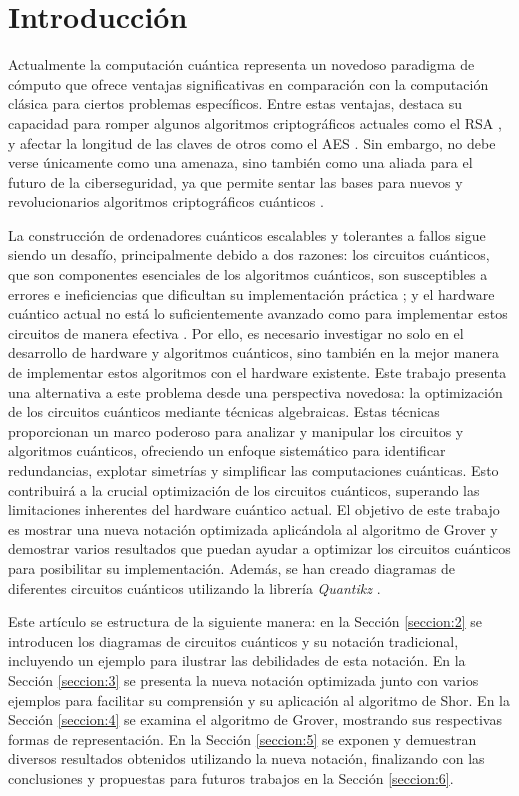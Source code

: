 \documentclass[10pt,conference,a4paper]{IEEEtran}
\begin{document}
\section{Introducción}
Actualmente la computación cuántica representa un novedoso paradigma de cómputo que ofrece ventajas significativas en comparación con la computación clásica para ciertos problemas específicos. Entre estas ventajas, destaca su capacidad para romper algunos algoritmos criptográficos actuales como el  RSA \cite{Shor} \cite{RSA}, y afectar la longitud de las claves de otros como el AES \cite{grover} \cite{grover_aes}. Sin embargo, no debe verse únicamente como una amenaza, sino también como una aliada para el futuro de la ciberseguridad, ya que permite sentar las bases para nuevos y revolucionarios algoritmos criptográficos cuánticos \cite{BB84} \cite{BB2014} \cite{E91}. 

La construcción de ordenadores cuánticos escalables y tolerantes a fallos sigue siendo un desafío, principalmente debido a dos razones: los circuitos cuánticos, que son componentes esenciales de los algoritmos cuánticos, son susceptibles a errores e ineficiencias que dificultan su implementación práctica \cite{error_correction}; y el hardware cuántico actual no está lo suficientemente avanzado como para implementar estos circuitos de manera efectiva \cite{IBM_hardware}. Por ello, es necesario investigar no solo en el desarrollo de hardware y algoritmos cuánticos, sino también en la mejor manera de implementar estos algoritmos con el hardware existente. Este trabajo presenta una alternativa a este problema desde una perspectiva novedosa: la optimización de los circuitos cuánticos mediante técnicas algebraicas. Estas técnicas  proporcionan un marco poderoso para analizar y manipular los circuitos y algoritmos cuánticos, ofreciendo un enfoque sistemático para identificar redundancias, explotar simetrías y simplificar las computaciones cuánticas. Esto contribuirá a la crucial optimización de los circuitos cuánticos, superando las limitaciones inherentes del hardware cuántico actual. El objetivo de este trabajo es mostrar una nueva notación optimizada aplicándola al algoritmo de Grover y demostrar varios resultados que puedan ayudar a optimizar los circuitos cuánticos para posibilitar su implementación. Además, se han creado diagramas de diferentes circuitos cuánticos utilizando la librería \textit{Quantikz} \cite{quantikz}.

Este artículo se estructura de la siguiente manera: en la Sección \ref{seccion:2} se introducen los diagramas de circuitos cuánticos y su notación tradicional, incluyendo un ejemplo para ilustrar las debilidades de esta notación. En la Sección \ref{seccion:3} se presenta la nueva notación optimizada junto con varios ejemplos para facilitar su comprensión y su aplicación al algoritmo de Shor. En la Sección \ref{seccion:4} se examina el algoritmo de Grover, mostrando sus respectivas formas de representación. En la Sección \ref{seccion:5} se exponen y demuestran diversos resultados obtenidos utilizando la nueva notación, finalizando con las conclusiones y propuestas para futuros trabajos en la Sección \ref{seccion:6}.
\end{document}
